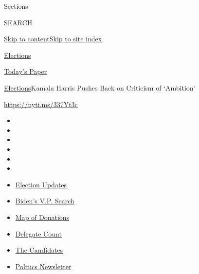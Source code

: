 Sections

SEARCH

\protect\hyperlink{site-content}{Skip to
content}\protect\hyperlink{site-index}{Skip to site index}

\href{https://www.nytimes.com/news-event/2020-election}{Elections}

\href{https://myaccount.nytimes.com/auth/login?response_type=cookie\&client_id=vi}{}

\href{https://www.nytimes.com/section/todayspaper}{Today's Paper}

\href{/news-event/2020-election}{Elections}\textbar{}Kamala Harris
Pushes Back on Criticism of `Ambition'

\url{https://nyti.ms/337Yt3c}

\begin{itemize}
\item
\item
\item
\item
\item
\item
\end{itemize}

\begin{itemize}
\item
  \href{https://www.nytimes.com/2020/07/31/us/elections/biden-vs-trump.html?action=click\&pgtype=Article\&state=default\&region=TOP_BANNER\&context=storylines_menu}{Election
  Updates}
\item
  \href{https://www.nytimes.com/article/biden-vice-president-2020.html?action=click\&pgtype=Article\&state=default\&region=TOP_BANNER\&context=storylines_menu}{Biden's
  V.P. Search}
\item
  \href{https://www.nytimes.com/interactive/2020/07/24/us/politics/trump-biden-campaign-donors.html?action=click\&pgtype=Article\&state=default\&region=TOP_BANNER\&context=storylines_menu}{Map
  of Donations}
\item
  \href{https://www.nytimes.com/interactive/2020/us/elections/delegate-count-primary-results.html?action=click\&pgtype=Article\&state=default\&region=TOP_BANNER\&context=storylines_menu}{Delegate
  Count}
\item
  \href{https://www.nytimes.com/interactive/2019/us/politics/2020-presidential-candidates.html?action=click\&pgtype=Article\&state=default\&region=TOP_BANNER\&context=storylines_menu}{The
  Candidates}
\item
  \href{https://www.nytimes.com/newsletters/politics?action=click\&pgtype=Article\&state=default\&region=TOP_BANNER\&context=storylines_menu}{Politics
  Newsletter}
\end{itemize}


